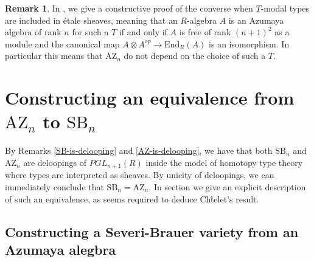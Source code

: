 \documentclass[10pt,a4paper]{article}
\theoremstyle{definition}
\newtheorem{remark}[theorem]{Remark}
\newcommand{\SB}{\mathrm{SB}}
\newcommand{\AZ}{\mathrm{AZ}}
\newcommand{\propTrunc}[1]{\lVert #1 \rVert}
\begin{document}
\begin{remark}\label{azumaya-independent-modality}
In \cite{coqazumaya}, we give a constructive proof of the converse when $T$-modal types are included in étale sheaves, meaning that an $R$-algebra $A$ is an Azumaya algebra of rank $n$ for such a $T$ if and only if $A$ is free of rank $(n+1)^2$ as a module and the canonical map $A\otimes A^{op}\rightarrow \mathrm{End}_R(A)$ is an isomorphism. In particular this means that $\AZ_n$ do not depend on the choice of such a $T$.
\end{remark}




\section{Constructing an equivalence from $\AZ_n$ to $\SB_n$}

By Remarks \ref{SB-is-delooping} and \ref{AZ-is-delooping}, we have that both $\SB_n$ and $\AZ_n$ are deloopings of $PGL_{n+1}(R)$ inside the model of homotopy type theory where types are interpreted as sheaves. By unicity of deloopings, we can immediately conclude that $\SB_n = \AZ_n$. In section we give an explicit description of such an equivalence, as seems required to deduce Ch\^telet's result. 


\subsection{Constructing a Severi-Brauer variety from an Azumaya alegbra}
\end{document}
